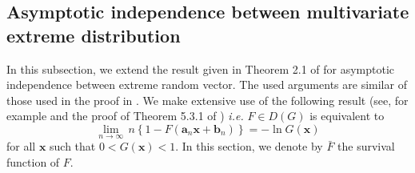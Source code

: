 \documentclass[11pt]{article}
\theoremstyle{definition}
\begin{document}
	\subsection{Asymptotic independence between multivariate extreme distribution}
	\label{subsec:asympto_indep}
	In this subsection, we extend the result given in Theorem 2.1 of \cite{takahashi1994asymptotic} for asymptotic independence between extreme random vector. The used arguments are similar of those used in the proof in \cite{takahashi1994asymptotic}. We make extensive use of the following result (see, for example \cite{10.1214/aop/1176993666} and the proof of Theorem 5.3.1 of \cite{galambos1978asymptotic}) \emph{i.e.} $F \in D(G)$ is equivalent to
	\begin{equation}
		\label{eq:app_galambos}
		\underset{n \rightarrow \infty}{\lim} \, n \left\{ 1 - F(\textbf{a}_n \textbf{x} + \textbf{b}_n) \right\} = - \ln G(\textbf{x})
	\end{equation}
	for all $\textbf{x}$ such that $0<G(\textbf{x}) <1$. In this section, we denote by $\bar{F}$ the survival function of $F$.
	
\end{document}
